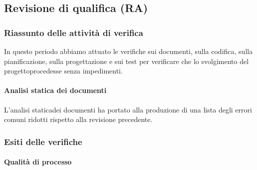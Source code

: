 \subsection{Revisione di qualifica (RA)}
\subsubsection{Riassunto delle attività di verifica}
In questo periodo abbiamo attuato le verifiche sui documenti, sulla codifica, sulla pianificazione, sulla progettazione e sui test per verificare che lo svolgimento del progetto\glosp procedesse senza impedimenti.  
\paragraph{Analisi statica dei documenti}
L'analisi statica\glosp dei documenti ha portato alla produzione di una lista degli errori comuni ridotti rispetto alla revisione precedente.
\subsubsection{Esiti delle verifiche} 
\paragraph{Qualità di processo}
